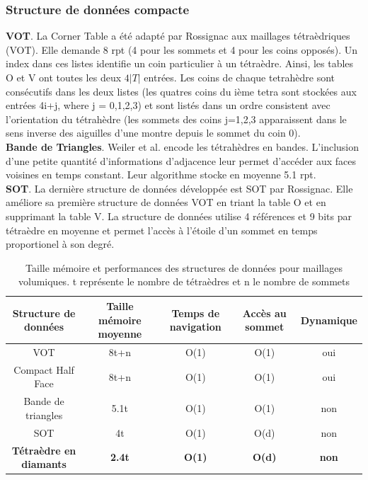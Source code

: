 \subsubsection{Structure de données compacte}
\noindent
\textbf{VOT}. La Corner Table a été adapté par Rossignac aux maillages tétraèdriques (VOT). Elle demande 8 rpt (4 pour les sommets et 4 pour les coins opposés). Un index dans ces listes identifie un coin particulier à un tétraèdre. Ainsi, les tables O et V ont toutes les deux $4|T|$ entrées. Les coins de chaque tetrahèdre sont consécutifs dans les deux listes (les quatres coins du ième tetra sont stockées aux entrées  4i+j, where j = 0,1,2,3) et sont listés dans un ordre consistent avec l'orientation du tétrahèdre (les sommets des coins j=1,2,3 apparaissent dans le sens inverse des aiguilles d'une montre depuis le sommet du coin 0).\\
\textbf{Bande de Triangles}. Weiler et al. \cite{triangle_strips_weiler} encode les tétrahèdres en bandes. L'inclusion d'une petite quantité d'informations d'adjacence leur permet d'accéder aux faces voisines en temps constant. Leur algorithme stocke en moyenne 5.1 rpt.\\
\textbf{SOT}. La dernière structure de données développée est SOT \cite{SOT} par Rossignac. Elle améliore sa première structure de données VOT en triant la table O et en supprimant la table V. La structure de données utilise 4 références et 9 bits par tétraèdre en moyenne et permet l'accès à l'étoile d'un sommet en temps proportionel à son degré.

\begin{table}[th]
\footnotesize
\begin{tabular}{|c | c | c | c | c|}
\hline
Structure de données & Taille mémoire moyenne & Temps de navigation & Accès au sommet & Dynamique\\
\hline
VOT & 8t+n & O(1) & O(1) & oui \\
Compact Half Face \cite{CHF} & 8t+n & O(1) & O(1) & oui\\
Bande de triangles \cite{triangle_strips_weiler} & 5.1t & O(1) & O(1) & non \\
SOT \cite{SOT} & 4t & O(1) & O(d)  & non\\
\textbf{Tétraèdre en diamants} & \textbf{ 2.4t } & \textbf{O(1)} & \textbf{O(d)} & \textbf{non} \\
\hline  
\end{tabular}
\caption{Taille mémoire et performances des structures de données pour maillages volumiques. t représente le nombre de tétraèdres et n le nombre de sommets}
\end{table}